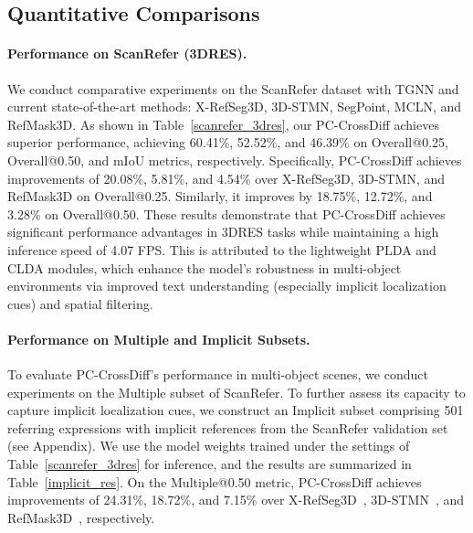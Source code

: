\documentclass[letterpaper]{article} %
\begin{document}
\subsection{Quantitative Comparisons}



\paragraph{Performance on ScanRefer (3DRES).} We conduct comparative experiments on the ScanRefer dataset with TGNN\cite{huangTextGuidedGraphNeural2021} and current state-of-the-art methods: X-RefSeg3D\cite{qianXRefSeg3DEnhancingReferring2024}, 3D-STMN\cite{wu3DSTMNDependencyDrivenSuperpointText2024}, SegPoint\cite{heSegPointSegmentAny2025}, MCLN\cite{qianMultibranchCollaborativeLearning2024}, and RefMask3D\cite{heRefMask3DLanguageGuidedTransformer2024}. As shown in Table~\ref{scanrefer_3dres}, our PC-CrossDiff achieves superior performance, achieving 60.41\%, 52.52\%, and 46.39\% on Overall@0.25, Overall@0.50, and mIoU metrics, respectively. Specifically, PC-CrossDiff achieves improvements of 20.08\%, 5.81\%, and 4.54\% over X-RefSeg3D, 3D-STMN, and RefMask3D on Overall@0.25. Similarly, it improves by 18.75\%, 12.72\%, and 3.28\% on Overall@0.50. These results demonstrate that PC-CrossDiff achieves significant performance advantages in 3DRES tasks while maintaining a high inference speed of 4.07 FPS. This is attributed to the lightweight PLDA and CLDA modules, which enhance the model's robustness in multi-object environments via improved text understanding (especially implicit localization cues) and spatial filtering.


\paragraph{Performance on Multiple and Implicit Subsets.}
To evaluate PC-CrossDiff's performance in multi-object scenes, we conduct experiments on the Multiple subset of ScanRefer. To further assess its capacity to capture implicit localization cues, we construct an Implicit subset comprising 501 referring expressions with implicit references from the ScanRefer validation set (see Appendix). We use the model weights trained under the settings of Table~\ref{scanrefer_3dres} for inference, and the results are summarized in Table~\ref{implicit_res}.
On the Multiple@0.50 metric, PC-CrossDiff achieves improvements of 24.31\%, 18.72\%, and 7.15\% over X-RefSeg3D~\cite{qianXRefSeg3DEnhancingReferring2024}, 3D-STMN~\cite{wu3DSTMNDependencyDrivenSuperpointText2024}, and RefMask3D~\cite{heRefMask3DLanguageGuidedTransformer2024}, respectively.
\end{document}
